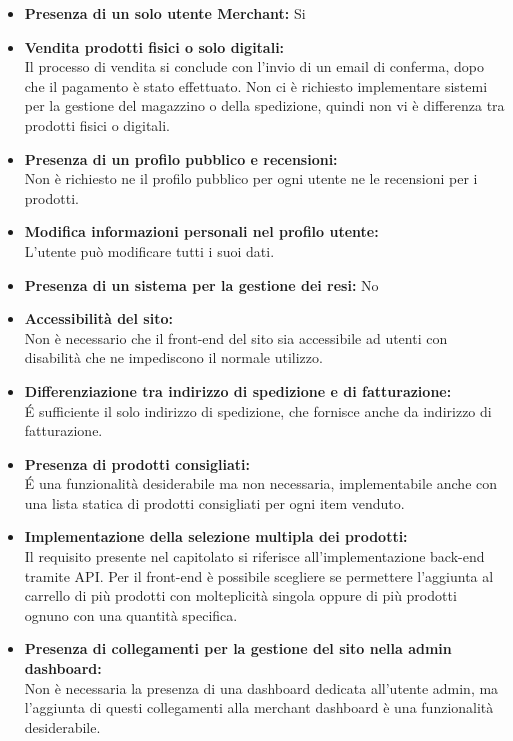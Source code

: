 \begin{itemize}
\item \textbf{Presenza di un solo utente Merchant:} Si
\item \textbf{Vendita prodotti fisici o solo digitali:} \\
Il processo di vendita si conclude con l'invio di un email di conferma, dopo che il pagamento è stato effettuato. Non ci è richiesto implementare sistemi per la gestione del magazzino o della spedizione, quindi non vi è differenza tra prodotti fisici o digitali.
\item \textbf{Presenza di un profilo pubblico e recensioni:} \\
Non è richiesto ne il profilo pubblico per ogni utente ne le recensioni per i prodotti. 
\item \textbf{Modifica informazioni personali nel profilo utente:} \\
L'utente può modificare tutti i suoi dati.
\item \textbf{Presenza di un sistema per la gestione dei resi:} No
\item \textbf{Accessibilità del sito:} \\
Non è necessario che il front-end del sito sia accessibile ad utenti con disabilità che ne impediscono il normale utilizzo.
\item \textbf{Differenziazione tra indirizzo di spedizione e di fatturazione:} \\
É sufficiente il solo indirizzo di spedizione, che fornisce anche da indirizzo di fatturazione.
\item \textbf{Presenza di prodotti consigliati:} \\
É una funzionalità desiderabile ma non necessaria, implementabile anche con una lista statica di prodotti consigliati per ogni item venduto.
\item \textbf{Implementazione della selezione multipla dei prodotti:} \\
Il requisito presente nel capitolato si riferisce all'implementazione back-end tramite API. Per il front-end è possibile scegliere se permettere l'aggiunta al carrello di più prodotti con molteplicità singola oppure di più prodotti ognuno con una quantità specifica.
\item \textbf{Presenza di collegamenti per la gestione del sito nella admin dashboard:} \\
Non è necessaria la presenza di una dashboard dedicata all'utente admin, ma l'aggiunta di questi collegamenti alla merchant dashboard è una funzionalità desiderabile.

\end{itemize}

